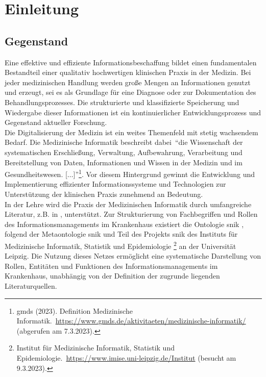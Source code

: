 \chapter{Einleitung}\label{ch:introduction}
\section{Gegenstand}\label{sec:gegenstand}
Eine effektive und effiziente Informationsbeschaffung bildet einen fundamentalen Bestandteil einer qualitativ hochwertigen klinischen Praxis in der Medizin.
Bei jeder medizinischen Handlung werden große Mengen an Informationen genutzt und erzeugt, sei es als Grundlage für eine Diagnose oder zur Dokumentation des Behandlungsprozesses.
Die strukturierte und klassifizierte Speicherung und Wiedergabe dieser Informationen ist ein kontinuierlicher Entwicklungsprozess und Gegenstand aktueller Forschung.\\

Die Digitalisierung der Medizin ist ein weites Themenfeld mit stetig wachsendem Bedarf.
Die Medizinische Informatik beschreibt dabei~\enquote{die Wissenschaft der systematischen Erschließung, Verwaltung, Aufbewahrung, Verarbeitung und Bereitstellung von Daten, Informationen und Wissen in der Medizin und im Gesundheitswesen. [$\dots$]}\footnote{\raggedright{}\ac{gmds} (2023). Definition Medizinische Informatik.\ \url{https://www.gmds.de/aktivitaeten/medizinische-informatik/} (abgerufen am 7.3.2023).}.
Vor diesem Hintergrund gewinnt die Entwicklung und Implementierung effizienter Informationssysteme und Technologien zur Unterstützung der klinischen Praxis zunehmend an Bedeutung.\\

In der Lehre wird die Praxis der Medizinischen Informatik durch umfangreiche Literatur, z.B. in \citet{bb}, unterstützt.
Zur Strukturierung von Fachbegriffen und Rollen des Informationsmanagements im Krankenhaus existiert die Ontologie \ac{snik} \citep{semantischesnetz}, folgend der Metaontologie \ac{snik} und Teil des Projekts \ac{snik} des Instituts für Medizinische Informatik, Statistik und Epidemiologie%
\footnote{\raggedright{}Institut für Medizinische Informatik, Statistik und Epidemiologie.\ \url{https://www.imise.uni-leipzig.de/Institut} (besucht am 9.3.2023).} an der Universität Leipzig.
Die Nutzung dieses Netzes ermöglicht eine systematische Darstellung von Rollen, Entitäten und Funktionen des Informationsmanagements im Krankenhaus, unabhängig von der Definition der zugrunde liegenden Literaturquellen.\\

